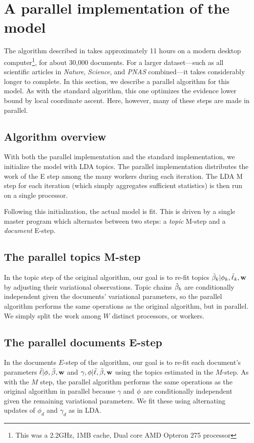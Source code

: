 \section{A parallel implementation of the model}
\label{section:influence_parallel_inference}

The algorithm described in  takes approximately 11
hours on a modern desktop computer\footnote{This was a 2.2GHz, 1MB
  cache, Dual core AMD Opteron 275 processor}, for about 30,000
documents.  For a larger dataset---such as all scientific articles in
\emph{Nature}, \emph{Science}, and \emph{PNAS} combined---it takes
considerably longer to complete.  In this section, we describe a
parallel algorithm for this model.  As with the standard algorithm,
this one optimizes the evidence lower bound by local coordinate
ascent.  Here, however, many of these steps are made in parallel.

\subsection*{Algorithm overview}
With both the parallel implementation and the standard implementation,
we initialize the model with LDA topics.  The parallel implementation
distributes the work of the E step among the many workers during each
iteration.  The LDA M step for each iteration (which simply aggregates
sufficient statistics) is then run on a single processor.

Following this initialization, the actual model is fit.  This is
driven by a single master program which alternates between two steps:
a \emph{topic} M-step and a \emph{document} E-step.

\subsection*{The parallel topics M-step}
In the topic step of the original algorithm, our goal is to re-fit
topics $\tilde{\beta}_k | \phi_k, \tilde{\ell}_k, \textbf{w}$ by adjusting their variational
observations.  Topic chains $\tilde{\beta}_k$ are conditionally independent
given the documents' variational parameters, so the parallel algorithm
performs the same operations as the original algorithm, but in
parallel.  We simply split the work among $W$ distinct processors, or
workers.

\subsection*{The parallel documents E-step}
In the documents $E$-step of the algorithm, our goal is to re-fit each
document's parameters $\tilde{\ell} | \phi, \tilde{\beta}, \textbf{w} $ and $\gamma, \phi |
\tilde{\ell}, \tilde{\beta}, \textbf{w}$ using the topics estimated in the $M$-step.  As with
the $M$ step, the parallel algorithm performs the same operations as
the original algorithm in parallel because $\gamma$ and $\phi$ are
conditionally independent given the remaining variational parameters.
We fit these using alternating updates of $\phi_{d}$ and $\gamma_d$ as
in LDA.

